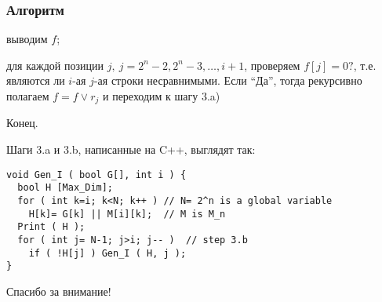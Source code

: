 \documentclass[14pt]{beamer}
\theoremstyle{plain} %
\theoremstyle{remark}
\begin{document}
\begin{frame}
\frametitle{Алгоритм}
	\begin{list}{)}{} 
	\item выводим $f$;
	\item для каждой позиции $j,\ j = 2^n -2, 2^n - 3, \dots, i+1$, 
	  проверяем $f[j] = 0 ?$, 
	  т.е. являются ли $i$-ая $j$-ая строки несравнимыми. Если ``Да'', тогда
	  рекурсивно полагаем $f = f \vee r_j$ и переходим к шагу 3.a)
	\end{list}
      Конец.
\end{frame}


Шаги 3.a и 3.b, написанные на C++, выглядят так:
\lstset{language=C++,basicstyle=\footnotesize}
\begin{lstlisting}
void Gen_I ( bool G[], int i ) {
  bool H [Max_Dim];
  for ( int k=i; k<N; k++ )	// N= 2^n is a global variable
    H[k]= G[k] || M[i][k];	// M is M_n
  Print ( H );
  for ( int j= N-1; j>i; j-- )	// step 3.b
    if ( !H[j] ) Gen_I ( H, j );
}
\end{lstlisting}


\begin{frame}
\begin{center}
Спасибо за внимание!
\end{center}
\end{frame}
\end{document}
